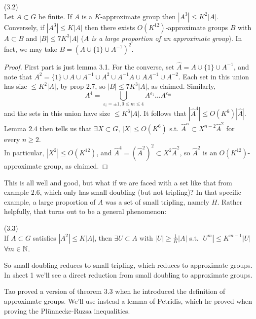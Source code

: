 \documentclass[a4paper]{article}
\begin{document}
\begin{prop} (3.2)\\
Let $A \subset G$ be finite. If $A$ is a $K$-approximate group then $|A^3| \leq K^2 |A|$. Conversely, if $|A^3| \leq K|A|$ then there exists $O(K^{12})$-approximate groups $B$ with $A \subset B$ and $|B| \leq 7K^3 |A|$ (\emph{$A$ is a large proportion of an approximate group}). In fact, we may take $B=(A \cup \{1 \} \cup A^{-1})^2$.
\begin{proof}
First part is just lemma 3.1. For the converse, set $\hat{A} = A \cup \{1\} \cup A^{-1}$, and note that $A^2 = \{1\} \cup A \cup A^{-1} \cup A^2 \cup A^{-1}A \cup AA^{-1} \cup A^{-2}$. Each set in this union has size $\leq K^2|A|$, by prop 2.7, so $|B| \leq 7K^3|A|$, as claimed. Similarly,
\[
A^4 = \bigcup_{\varepsilon_i = \pm 1, 0 \leq m \leq 4} A^{\varepsilon_1}...A^{\varepsilon_m}
\]
and the sets in this union have size $\leq K^6|A|$. It follows that $|\hat{A}^4| \leq O(K^6) |\hat{A}|$. Lemma 2.4 then tells us that $\exists X \subset G$, $|X| \leq O(K^6)$ s.t. $\hat{A}^n \subset X^{n-2} \hat{A}^2$ for every $n \geq 2$.\\
In particular, $|X^2| \leq O(K^{12})$, and $\hat{A}^4 = (\hat{A}^2)^2 \subset X^2 \hat{A}^2$, so $\hat{A}^2$ is an $O(K^{12})$-approximate group, as claimed.
\end{proof}
\end{prop}

This is all well and good, but what if we are faced with a set like that from example 2.6, which only has small doubling (but not tripling)? In that specific example, a large proportion of $A$ was a set of small tripling, namely $H$. Rather helpfully, that turns out to be a general phenomenon:

\begin{thm} (3.3)\\
If $A \subset G$ satisfies $|A^2| \leq K|A|$, then $\exists U \subset A$ with $|U| \geq \frac{1}{K}|A|$ s.t. $|U^m| \leq K^{m-1} |U|$ $\forall m \in \mathbb{N}$.
\end{thm}

So small doubling reduces to small tripling, which reduces to approximate groups. In sheet 1 we'll see a direct reduction from small doubling to approximate groups.

Tao proved a version of theorem 3.3 when he introduced the definition of approximate groups. We'll use instead a lemma of Petridis, which he proved when proving the Pl\"{u}nnecke-Ruzsa inequalities.
\end{document}
